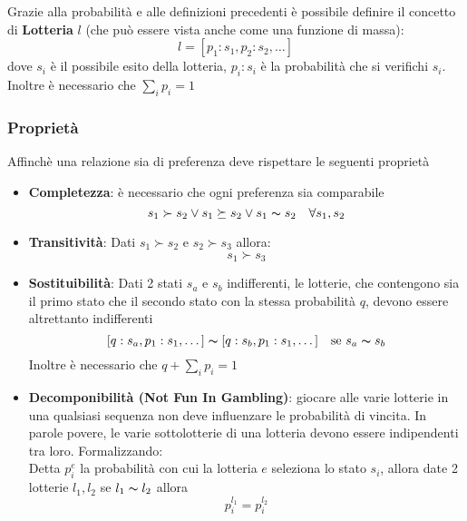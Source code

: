 Grazie alla probabilità e alle definizioni precedenti è possibile definire il concetto di \textbf{Lotteria} $l$ (che può essere vista anche come una funzione di massa):
\begin{equation}
    l = [p_1:s_1, p_2:s_2, \dots]
\end{equation}
dove $s_i$ è il possibile esito della lotteria, $p_i:s_i$ è la probabilità che si verifichi $s_i$.
Inoltre è necessario che $\sum_{i} p_i = 1$

\subsubsection{Proprietà}
Affinchè una relazione sia di preferenza deve rispettare le seguenti proprietà
\begin{itemize}
    \item \textbf{Completezza}: è necessario che ogni preferenza sia comparabile
        \begin{equation} \label{prop: C}
            s_1 \succ s_2 \vee s_1 \succeq s_2 \vee s_1 \thicksim s_2 \quad \forall s_1, s_2 
        \end{equation}
    \item \textbf{Transitività}: Dati $s_1 \succ s_2 \mbox{ e } s_2 \succ s_3$ allora:
        \begin{equation} \label{prop: T}
            s_1 \succ s_3 
        \end{equation}
    \item \textbf{Sostituibilità}: Dati 2 stati $s_a$ e $s_b$ indifferenti, le lotterie, che contengono sia il primo stato che il secondo stato
    con la stessa probabilità $q$, devono essere altrettanto indifferenti
    \begin{equation} \label{prop: S}
        [q:s_a,p_1:s_1, \dots] \thicksim [q:s_b, p_1:s_1, \dots] \quad \mbox{se } s_a \thicksim s_b
    \end{equation}
    Inoltre è necessario che $q + \sum_i p_i = 1$
    \item  \textbf{Decomponibilità (Not Fun In Gambling)}: giocare alle varie lotterie in una qualsiasi sequenza non deve influenzare le probabilità di vincita.
    In parole povere, le varie sottolotterie di una lotteria devono essere indipendenti tra loro. Formalizzando:\\
    Detta $p_i^e$ la probabilità con cui la lotteria $e$ seleziona lo stato $s_i$, allora date 2 lotterie $l_1,l_2$ se $l_1 \thicksim l_2$ allora
    \begin{equation} \label{prop: D}
        p_i^{l_1} = p_i^{l_2}
    \end{equation} 


\end{itemize}
